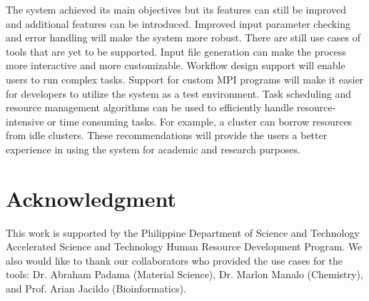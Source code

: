 The system achieved its main objectives but its features can still be improved and additional features can be introduced. Improved input parameter checking and error handling will make the system more robust. There are still use cases of tools that are yet to be supported. Input file generation can make the process more interactive and more customizable.  Workflow design support will enable users to run complex tasks. Support for custom MPI programs will make it easier for developers to utilize the system as a test environment. Task scheduling and resource management algorithms can be used to efficiently handle resource-intensive or time consuming tasks. For example, a cluster can borrow resources from idle clusters. These recommendations will provide the users a better experience in using the system for academic and research purposes. 




\section*{Acknowledgment}
This work is supported by the Philippine Department of Science and Technology Accelerated Science and Technology Human Resource Development Program. We also would like to thank our collaborators who provided the use cases for the tools: Dr. Abraham Padama (Material Science), Dr. Marlon Manalo (Chemistry), and Prof. Arian Jacildo (Bioinformatics).




